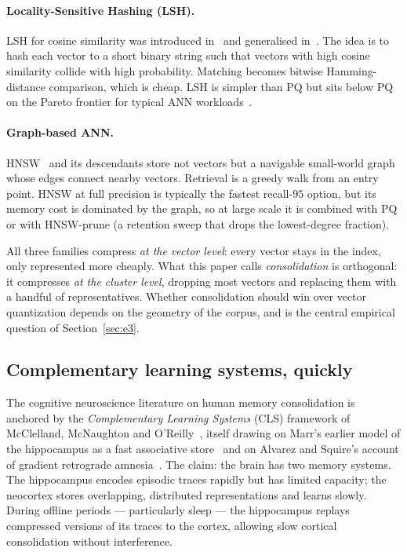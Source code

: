 \paragraph{Locality-Sensitive Hashing (LSH).} LSH for cosine similarity
was introduced in~\cite{charikarLSH2002} and generalised
in~\cite{datarLSH2004}. The idea is to hash each vector to a short
binary string such that vectors with high cosine similarity collide
with high probability. Matching becomes bitwise Hamming-distance
comparison, which is cheap. LSH is simpler than PQ but sits below
PQ on the Pareto frontier for typical ANN
workloads~\cite{johnson2019faiss}.

\paragraph{Graph-based ANN.} HNSW~\cite{malkovHNSW2018} and its
descendants store not vectors but a navigable small-world graph whose
edges connect nearby vectors. Retrieval is a greedy walk from an entry
point. HNSW at full precision is typically the fastest recall-$95$
option, but its memory cost is dominated by the graph, so at large
scale it is combined with PQ or with HNSW-prune (a retention sweep that
drops the lowest-degree fraction).

All three families compress \emph{at the vector level}: every vector
stays in the index, only represented more cheaply. What this paper calls
\emph{consolidation} is orthogonal: it compresses \emph{at the cluster
level}, dropping most vectors and replacing them with a handful of
representatives. Whether consolidation should win over vector quantization
depends on the geometry of the corpus, and is the central empirical
question of Section~\ref{sec:e3}.

\subsection{Complementary learning systems, quickly}
\label{sec:background:cls}

The cognitive neuroscience literature on human memory consolidation is
anchored by the \emph{Complementary Learning Systems} (CLS) framework of
McClelland, McNaughton and
O'Reilly~\cite{mcclellandConsolidation1995}, itself drawing on Marr's
earlier model of the hippocampus as a fast associative
store~\cite{marrSimple1971} and on Alvarez and Squire's account of
gradient retrograde amnesia~\cite{alvarezSquireConsolidation1994}. The
claim: the brain has two memory systems. The hippocampus encodes
episodic traces rapidly but has limited capacity; the neocortex stores
overlapping, distributed representations and learns slowly. During
offline periods --- particularly sleep --- the hippocampus replays
compressed versions of its traces to the cortex, allowing slow cortical
consolidation without interference.

